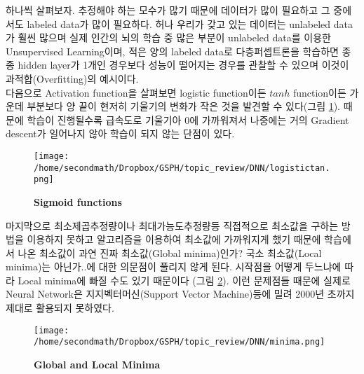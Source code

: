 \documentclass[10pt]{article}
\begin{document}
하나씩 살펴보자. 추정해야 하는 모수가 많기 때문에 데이터가 많이 필요하고 그 중에서도 labeled data가 많이 필요하다. 허나 우리가 갖고 있는 데이터는 unlabeled data가 훨씬 많으며 실제 인간의 뇌의 학습 중 많은 부분이 unlabeled data를 이용한 Unsupervised Learning이며, 적은 양의 labeled data로 다층퍼셉트론을 학습하면 종종 hidden layer가 1개인 경우보다 성능이 떨어지는 경우를 관찰할 수 있으며 이것이 과적합(Overfitting)의 예시이다. \\

다음으로 Activation function을 살펴보면 logistic function이든 $tanh$ function이든 가운데 부분보다 양 끝이 현저히 기울기의 변화가 작은 것을 발견할 수 있다(그림 \ref{logistictan}). 때문에 학습이 진행될수록 급속도로 기울기아 0에 가까워져서 나중에는 거의 Gradient descent가 일어나지 않아 학습이 되지 않는 단점이 있다\cite{bengio1994learning}. 

\begin{figure}[!ht]
\centering
\texttt{[image: /home/secondmath/Dropbox/GSPH/topic\_review/DNN/logistictan.png]}
\caption{\bf{Sigmoid functions}}
\label{logistictan}
\end{figure}



마지막으로 최소제곱추정량이나 최대가능도추정량등 직접적으로 최소값을 구하는 방법을 이용하지 못하고 알고리즘을 이용하여 최소값에 가까워지게 했기 때문에 학습에서 나온 최소값이 과연 진짜 최소값(Global minima)인가? 국소 최소값(Local minima)는 아닌가..에 대한 의문점이 풀리지 않게 된다. 시작점을 어떻게 두느냐에 따라 Local minima에 빠질 수도 있기 때문이다 (그림 \ref{minima})\cite{kimjunmoppt}. 이런 문제점들 때문에 실제로 Neural Network은 지지벡터머신(Support Vector Machine)등에 밀려 2000년 초까지 제대로 활용되지 못하였다.


\begin{figure}[!ht]
\centering
\texttt{[image: /home/secondmath/Dropbox/GSPH/topic\_review/DNN/minima.png]}
\caption{\bf{Global and Local Minima}}
\label{minima}
\end{figure}
\end{document}
